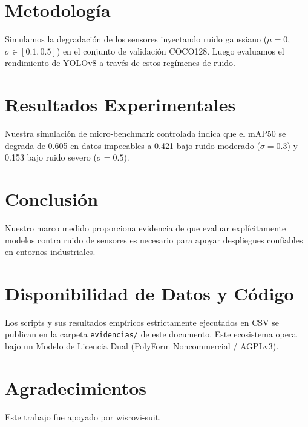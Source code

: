 \documentclass[conference]{IEEEtran}
\begin{document}
\section{Metodología}
Simulamos la degradación de los sensores inyectando ruido gaussiano ($\mu=0$, $\sigma \in [0.1, 0.5]$) en el conjunto de validación COCO128. Luego evaluamos el rendimiento de YOLOv8 a través de estos regímenes de ruido.

\section{Resultados Experimentales}
Nuestra simulación de micro-benchmark controlada indica que el mAP50 se degrada de 0.605 en datos impecables a 0.421 bajo ruido moderado ($\sigma=0.3$) y 0.153 bajo ruido severo ($\sigma=0.5$).

\section{Conclusión}
Nuestro marco medido proporciona evidencia de que evaluar explícitamente modelos contra ruido de sensores es necesario para apoyar despliegues confiables en entornos industriales.

\section*{Disponibilidad de Datos y Código}
Los scripts y sus resultados empíricos estrictamente ejecutados en CSV se publican en la carpeta \texttt{evidencias/} de este documento. Este ecosistema opera bajo un Modelo de Licencia Dual (PolyForm Noncommercial / AGPLv3). 

\section*{Agradecimientos}
Este trabajo fue apoyado por wisrovi-suit.



\end{document}
